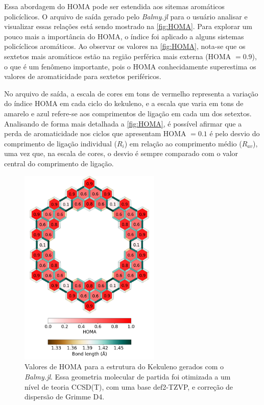 Essa abordagem do \gls{HOMA} pode ser estendida aos sitemas aromáticos  policíclicos. O arquivo de saída gerado pelo \textit{Balmy.jl} para o usuário analisar e visualizar essas relações está sendo mostrado na \autoref{fig:HOMA}. Para explorar um pouco mais a importância do \gls{HOMA}, o índice foi aplicado a alguns sistemas policíclicos aromáticos. Ao observar os valores na \autoref{fig:HOMA}, nota-se que os sextetos mais aromáticos estão na região perférica mais externa (\gls{HOMA} $= 0.9$), o que é um fenômeno importante, pois o \gls{HOMA} conhecidamente superestima os valores de aromaticidade para sextetos periféricos\autocite{giov2020}. 

No arquivo de saída, a escala de cores em tons de vermelho representa a variação do índice \gls{HOMA} em cada ciclo do kekuleno, e a escala que varia em tons de amarelo e azul refere-se aos comprimentos de ligação em cada um dos setextos. Analisando de forma mais detalhada a \autoref{fig:HOMA}, é possível afirmar que a perda de aromaticidade nos ciclos que apresentam \gls{HOMA} $= 0.1$ é pelo desvio do comprimento de ligação individual ($R_i$) em relação ao comprimento médio ($R_{av}$), uma vez que, na escala de cores, o desvio é sempre comparado com o valor central do comprimento de ligação. 

\begin{figure}[htb]
\caption{\label{fig:HOMA} Valores de HOMA para a estrutura do Kekuleno gerados com o \textit{Balmy.jl}. Essa geometria molecular de partida foi otimizada a um nível de teoria CCSD(T), com uma base def2-TZVP, e correção de dispersão de Grimme D4.}
	\begin{center}
		\includegraphics[width=0.60\textwidth]{images/geom.png}
	\end{center}
\end{figure}

